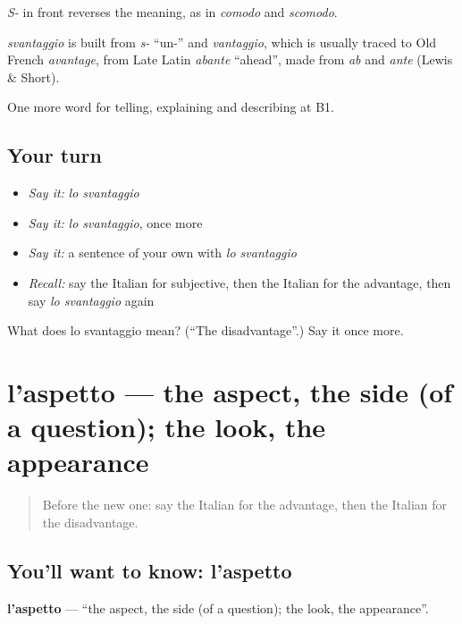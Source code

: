 \emph{S-} in front reverses the meaning, as in \emph{comodo} and \emph{scomodo}.

\begin{cousinweb}
\emph{svantaggio} is built from \emph{s-} \textquotedblleft{}un-\textquotedblright{} and \emph{vantaggio}, which is usually traced to Old French \emph{avantage}, from Late Latin \emph{abante} \textquotedblleft{}ahead\textquotedblright{}, made from \emph{ab} and \emph{ante} (Lewis \& Short).
\end{cousinweb}

\begin{grammarlens}[title={What you've built}]
One more word for telling, explaining and describing at B1.
\end{grammarlens}

\subsection*{Your turn}
\begin{itemize}
\raggedright
  \item \emph{Say it:} \emph{lo svantaggio}
  \item \emph{Say it:} \emph{lo svantaggio}, once more
  \item \emph{Say it:} a sentence of your own with \emph{lo svantaggio}
  \item \emph{Recall:} say the Italian for subjective, then the Italian for the advantage, then say \emph{lo svantaggio} again
\end{itemize}

\begin{tcolorbox}[breakable,colback=teal!4,colframe=teal!35!black,title={Before you move on}]
What does lo svantaggio mean? (\textquotedblleft{}The disadvantage\textquotedblright{}.) Say it once more.
\end{tcolorbox}
\section[l'aspetto]{l'aspetto — the aspect, the side (of a question); the look, the appearance}

\label{lesson:IT-C348-aspetto}



\begin{quote}
Before the new one: say the Italian for the advantage, then the Italian for the disadvantage.
\end{quote}

\subsection*{You'll want to know: l'aspetto}
\textbf{l'aspetto} — \textquotedblleft{}the aspect, the side (of a question); the look, the appearance\textquotedblright{}.


